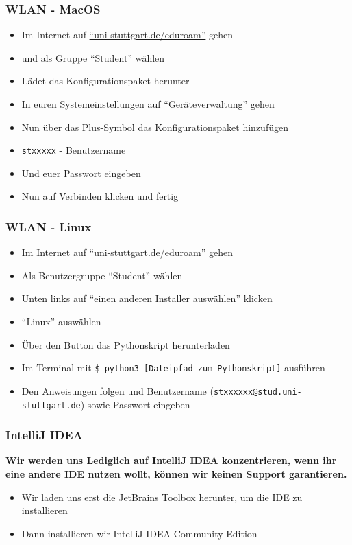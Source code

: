 \documentclass{../../presentation}
\begin{document}
\begin{frame}[fragile]
  \frametitle{WLAN - MacOS}
  \begin{itemize}
    \item Im Internet auf \href{http://uni-stuttgart.de/eduroam}{\enquote{uni-stuttgart.de/eduroam}} gehen
    \item und als Gruppe \enquote{Student} wählen
    \item Lädet das Konfigurationspaket herunter
    \item In euren Systemeinstellungen auf \enquote{Geräteverwaltung} gehen
    \item Nun über das Plus-Symbol das Konfigurationspaket hinzufügen
    \item \texttt{stxxxxx} - Benutzername
    \item Und euer Passwort eingeben
    \item Nun auf Verbinden klicken und fertig
  \end{itemize}
\end{frame}

\begin{frame}[fragile]
  \frametitle{WLAN - Linux}
  \begin{itemize}
    \item Im Internet auf \href{http://uni-stuttgart.de/eduroam}{\enquote{uni-stuttgart.de/eduroam}} gehen
    \item Als Benutzergruppe \enquote{Student} wählen
    \item Unten links auf \enquote{einen anderen Installer auswählen} klicken
    \item \enquote{Linux} auswählen
    \item Über den Button das Pythonskript herunterladen
    \item Im Terminal mit \texttt{\$ python3 [Dateipfad zum Pythonskript]} ausführen
    \item Den Anweisungen folgen und Benutzername (\texttt{stxxxxxx@stud.uni-stuttgart.de}) sowie Passwort eingeben
  \end{itemize}
\end{frame}

\begin{frame}
  \frametitle{IntelliJ IDEA}
  \textbf{\achtung{} Wir werden uns Lediglich auf IntelliJ IDEA konzentrieren, wenn ihr eine andere IDE nutzen wollt, können wir keinen Support garantieren. }
  \newline
  \begin{itemize}
    \item Wir laden uns erst die JetBrains Toolbox herunter, um die IDE zu installieren
    \item Dann installieren wir IntelliJ IDEA Community Edition
  \end{itemize}
\end{frame}
\end{document}
